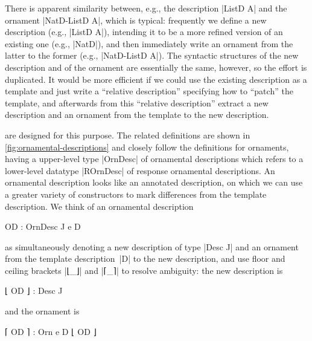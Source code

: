 There is apparent similarity between, e.g., the description |ListD A| and the ornament |NatD-ListD A|, which is typical:
frequently we define a new description (e.g., |ListD A|), intending it to be a more refined version of an existing one (e.g., |NatD|), and then immediately write an ornament from the latter to the former (e.g., |NatD-ListD A|).
The syntactic structures of the new description and of the ornament are essentially the same, however, so the effort is duplicated.
It would be more efficient if we could use the existing description as a template and just write a ``relative description'' specifying how to ``patch'' the template, and afterwards from this ``relative description'' extract a new description and an ornament from the template to the new description.

 are designed for this purpose.
The related definitions are shown in \autoref{fig:ornamental-descriptions} and closely follow the definitions for ornaments, having a upper-level type |OrnDesc| of ornamental descriptions which refers to a lower-level datatype |ROrnDesc| of response ornamental descriptions.
An ornamental description looks like an annotated description, on which we can use a greater variety of constructors to mark differences from the template description.
We think of an ornamental description
\begin{code}
OD : OrnDesc J e D
\end{code}
as simultaneously denoting a new description of type |Desc J| and an ornament from the template description~|D| to the new description, and use floor and ceiling brackets |⌊_⌋| and |⌈_⌉| to resolve ambiguity: the new description is
\begin{code}
⌊ OD ⌋ : Desc J
\end{code}
and the ornament is
\begin{code}
⌈ OD ⌉ : Orn e D ⌊ OD ⌋
\end{code}


